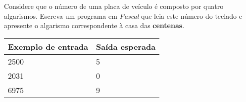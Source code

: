 \item Considere que o número de uma placa de veículo é composto por quatro
algarismos. Escreva um programa em \emph{Pascal} que leia este número  do
teclado e apresente o algarismo correspondente à casa das \textbf{centenas}.

\begin{center}
\begin{tabular}{|l|l|} \hline
Exemplo de entrada & Saída esperada \\ \hline
2500                & 5               \\ \hline
2031                & 0               \\ \hline
6975                & 9               \\ \hline
\end{tabular}
\end{center}
